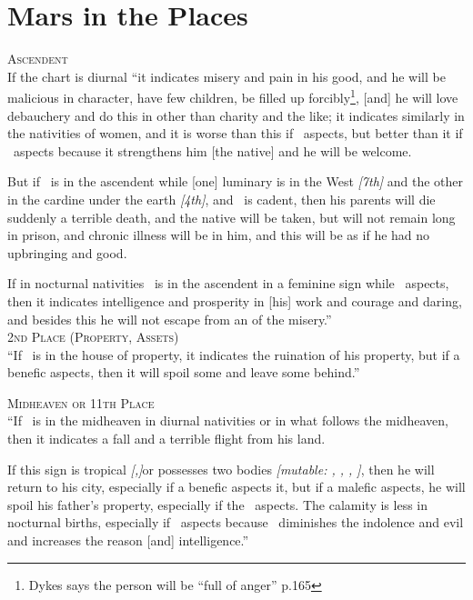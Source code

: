 \section{Mars in the Places}

\textsc{Ascendent} \hfill \\
\indent If the chart is diurnal ``it indicates misery and pain in his good, and he will be malicious in character, have few children, be filled up forcibly\footnote{Dykes says the person will be ``full of anger'' p.165}, [and] he will love debauchery and do this in other than charity and the like; it indicates similarly in the nativities of women, and it is worse than this if \Saturn\, aspects, but better than it if \Jupiter\, aspects because it strengthens him [the native] and he will be welcome.

But if \Mars\, is in the ascendent while [one] luminary is in the West \textsl{[7th]} and the other in the cardine under the earth \textsl{[4th]}, and \Jupiter\, is cadent, then his parents will die suddenly a terrible death, and the native will be taken, but will not remain long in prison, and chronic illness will be in him, and this will be as if he had no upbringing and good.

If in nocturnal nativities \Mars\, is in the ascendent in a feminine sign while \Jupiter\, aspects, then it indicates intelligence and prosperity in [his] work and courage and daring, and besides this he will not escape from an of the misery.'' \\

\noindent\textsc{2nd Place (Property, Assets)} \hfill \\
\indent ``If \Mars\, is in the house of property, it indicates the ruination of his property, but if a benefic aspects, then it will spoil some and leave some behind.''

\noindent\textsc{Midheaven or 11th Place} \hfill \\
``If \Mars\, is in the midheaven in diurnal nativities or in what follows the midheaven, then it indicates a fall and a terrible flight from his land. 

If this sign is tropical \textsl{[\Aries,\Libra]}or possesses two bodies \textsl{[mutable: \Gemini, \Virgo, \Sagittarius, \Pisces]}, then he will return to his city, especially if a benefic aspects it, but if a malefic aspects, he will spoil his father's property, especially if the \Sun\, aspects. The calamity is less in nocturnal births, especially if \Jupiter\, aspects because \Jupiter\, diminishes the indolence and evil and increases the reason [and] intelligence.''

